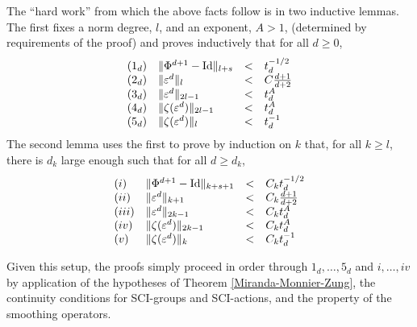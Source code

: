 \documentclass{article}
\begin{document}
The ``hard work'' from which the above facts follow is in two inductive lemmas.  The first fixes a norm degree, $l$, and an exponent, $A>1$, (determined by requirements of the proof) and proves inductively that for all $d\geq0$,
$$\begin{array}{llcl}
(1_d) & \|\Phi^{d+1}-\textrm{Id}\|_{l+s} &<& t_d^{-1/2} \\
(2_d) & \|\varepsilon^d\|_l &<& C\frac{d+1}{d+2} \\
(3_d) & \|\varepsilon^d\|_{2l-1} &<& t_d^A \\
(4_d) & \|\zeta(\varepsilon^d)\|_{2l-1} &<& t_d^A \\
(5_d) & \|\zeta(\varepsilon^d)\|_l &<& t_d^{-1}
\end{array}$$
The second lemma uses the first to prove by induction on $k$ that, for all $k\geq l$, there is $d_k$ large enough such that for all $d\geq d_k$,
 $$\begin{array}{llcl}
(i) & \|\Phi^{d+1}-\textrm{Id}\|_{k+s+1} &<& C_k t_d^{-1/2} \\
(ii) & \|\varepsilon^d\|_{k+1} &<& C_k\frac{d+1}{d+2} \\
(iii) & \|\varepsilon^d\|_{2k-1} &<& C_k t_d^A \\
(iv) & \|\zeta(\varepsilon^d)\|_{2k-1} &<& C_k t_d^A \\
(v) & \|\zeta(\varepsilon^d)\|_k &<& C_k t_d^{-1}
\end{array}$$

Given this setup, the proofs simply proceed in order through ${1_d,\ldots,5_d}$ and ${i,\ldots,iv}$ by application of the hypotheses of Theorem \ref{Miranda-Monnier-Zung}, the continuity conditions for SCI-groups and SCI-actions, and the property of the smoothing operators.
\end{document}
